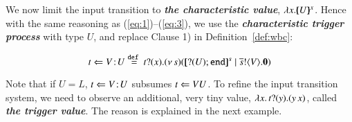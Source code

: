 \smallskip 

We now limit the input transition to 
{\bf\em the characteristic value}, $\lambda x.[\!\!(U)\!\!]^{x}$. 
Hence with the same reasoning as (\ref{eq:1})--(\ref{eq:3}), 
we use the {\bf\em characteristic trigger process} with type 
$U$, and replace Clause 1) in Definition~\ref{def:wbc}:

\begin{equation}\label{eq:4}
	\ftrigger{t}{V}{U} \defeq 
\fotrigger{t}{x}{s}{\btinp{U} \tinact}{V}
\end{equation}

Note that if $U=L$, $t \Leftarrow V \! : \! U$ subsumes 
$t \Leftarrow V{U}$. 
To refine the input transition system, we need to observe 
an additional, very tiny value, 
$\lambda {x}.\,t ? (y) . (y\, {{x}})$, 
called {\bf\em the trigger value}. 
The reason is explained in the next example. 

\smallskip 

